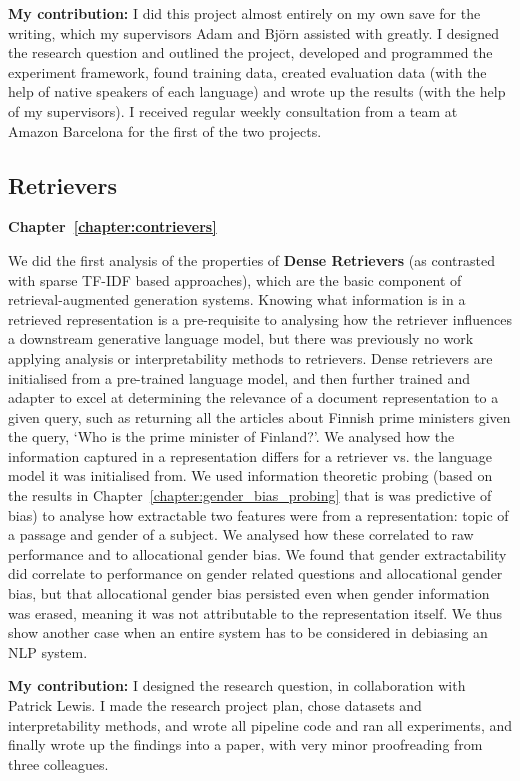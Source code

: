 \textbf{My contribution:} I did this project almost entirely on my own save for the writing, which my supervisors Adam and Björn assisted with greatly. I designed the research question and outlined the project, developed and programmed the experiment framework, found training data, created evaluation data (with the help of native speakers of each language) and wrote up the results (with the help of my supervisors). I received regular weekly consultation from a team at Amazon Barcelona for the first of the two projects.

\subsection{Retrievers}
\textbf{Chapter~\ref{chapter:contrievers}}

We did the first analysis of the properties of \textbf{Dense Retrievers} (as contrasted with sparse TF-IDF based approaches), which are the basic component of retrieval-augmented generation systems. Knowing what information is in a retrieved representation is a pre-requisite to analysing how the retriever influences a downstream generative language model, but there was previously no work applying analysis or interpretability methods to retrievers. Dense retrievers are initialised from a pre-trained language model, and then further trained and adapter to excel at determining the relevance of a document representation to a given query, such as returning all the articles about Finnish prime ministers given the query, `Who is the prime minister of Finland?'. 
We analysed how the information captured in a representation differs for a retriever vs. the language model it was initialised from. We used information theoretic probing (based on the results in Chapter~\ref{chapter:gender_bias_probing} that is was predictive of bias) to analyse how extractable two features were from a representation: topic of a passage and gender of a subject. We analysed how these correlated to raw performance and to allocational gender bias. We found that gender extractability did correlate to performance on gender related questions and allocational gender bias, but that allocational gender bias persisted even when gender information was erased, meaning it was not attributable to the representation itself. We thus show another case when an entire system has to be considered in debiasing an NLP system.

\textbf{My contribution:} I designed the research question, in collaboration with Patrick Lewis. I made the research project plan, chose datasets and interpretability methods, and wrote all pipeline code and ran all experiments, and finally wrote up the findings into a paper, with very minor proofreading from three colleagues.

